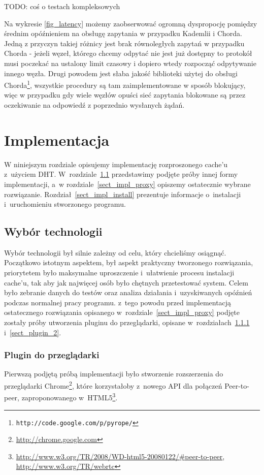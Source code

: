 \documentclass[a4paper,11pt]{scrartcl}
\newcommand{\f}{\texttt}
\newcommand{\s}{ }
\newcommand{\keszu}{cache'u}
\begin{document}
TODO: coś o testach kompleksowych

Na wykresie \ref{fig_latency} możemy zaobserwować ogromną dyspropocję pomiędzy średnim opóźnieniem na obsługę zapytania w przypadku Kademlii i Chorda. Jedną z przyczyn takiej różnicy jest brak równoległych zapytań w przypadku Chorda - jeżeli węzeł, którego chcemy odpytać nie jest już dostępny to protokół musi poczekać na ustalony limit czasowy i dopiero wtedy rozpocząć odpytywanie innego węzła. Drugi powodem jest słaba jakość biblioteki użytej do obsługi Chorda\footnote{\f{http://code.google.com/p/pyrope/}}, wszystkie procedury są tam zaimplementowane w sposób blokujący, więc w przypadku gdy wiele węzłów opuści sieć zapytania blokowane są przez oczekiwanie na odpowiedź z poprzednio wysłanych żądań.


\section{Implementacja}
\label{sect_impl}
W niniejszym rozdziale opisujemy implementację rozproszonego \keszu\s z~użyciem DHT. W~rozdziale~\ref{sect_impl_technology}
przedstawimy podjęte próby innej formy implementacji, a~w rozdziale~\ref{sect_impl_proxy} opiszemy ostatecznie wybrane rozwiązanie.
Rozdział~\ref{sect_impl_install} prezentuje informacje o~instalacji i~uruchomieniu stworzonego programu.

\subsection{Wybór technologii}
\label{sect_impl_technology}
Wybór technologii był silnie zależny od celu, który chcieliśmy osiągnąć. Początkowo istotnym aspektem, był aspekt praktyczny tworzonego rozwiązania, priorytetem było maksymalne uproszczenie i~ułatwienie procesu instalacji \keszu, tak aby jak najwięcej osób było chętnych przetestować system. Celem było zebranie danych do testów oraz analiza działania i~uzyskiwanych opóźnień podczas normalnej pracy programu. z~tego powodu przed implementacją ostatecznego rozwiązania opisanego w~rozdziale~\ref{sect_impl_proxy} podjęte zostały próby utworzenia pluginu do przeglądarki, opisane w~rozdziałach~\ref{sect_plugin_1} i~\ref{sect_plugin_2}.

\subsubsection{Plugin do przeglądarki}
\label{sect_plugin_1}
Pierwszą podjętą próbą implementacji było stworzenie rozszerzenia do przeglądarki Chrome\footnote{\url{http://chrome.google.com}}, które korzystałoby z~nowego API dla połączeń Peer-to-peer, zaproponowanego w~HTML5\footnote{\url{http://www.w3.org/TR/2008/WD-html5-20080122/#peer-to-peer}, \url{http://www.w3.org/TR/webrtc}}.
\end{document}
